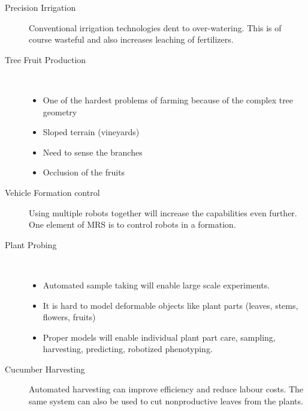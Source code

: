 \begin{description}
        \item[Precision Irrigation] Conventional irrigation technologies dent to over-watering. 
        This is of course wasteful and also increases leaching of fertilizers.
        \item[Tree Fruit Production] \
        \begin{itemize}
            \item One of the hardest problems of farming because of the complex tree geometry
            \item Sloped terrain (vineyards)
            \item Need to sense the branches
            \item Occlusion of the fruits
        \end{itemize}
        \item[Vehicle Formation control] Using multiple robots together will increase the capabilities even further. One element of MRS is to control robots in a formation.
        \item[Plant Probing] \
        \begin{itemize}
            \item Automated sample taking will enable large scale experiments.
            \item It is hard to model deformable objects like plant parts (leaves, stems, flowers, fruits)
            \item Proper models will enable individual plant part care, sampling, harvesting, predicting, robotized phenotyping.
        \end{itemize} 
        \item[Cucumber Harvesting] Automated harvesting can improve efficiency and reduce labour costs. The same system can also be used to cut nonproductive leaves from the plants.
    
    \end{description} 
